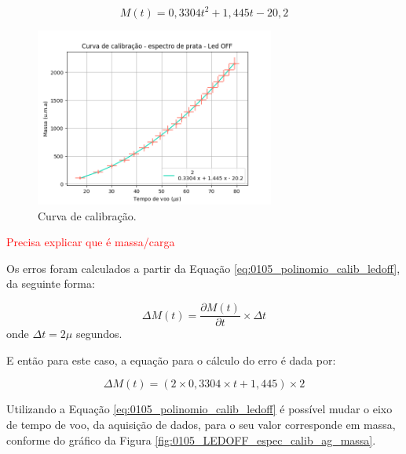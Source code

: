 \begin{equation}
\label{eq:0105_polinomio_calib_ledoff}
M(t) = 0,3304t^2 + 1,445t - 20,2
\end{equation}
\begin{figure}
  \centering  
  \includegraphics[width=0.7\textwidth]{exp_01/LEDOFF_curv+erro_calib.png}
  \caption{Curva de calibração.}
  \label{fig:1105_curva_calib_ledoff} 
\end{figure}



\textcolor{red}{Precisa explicar que é massa/carga}







Os erros foram calculados a partir da Equação \ref{eq:0105_polinomio_calib_ledoff}, da seguinte forma:

\begin{equation}
    \Delta M(t) = \frac{\partial M(t)}{\partial t} \times \Delta t
\end{equation}
onde $\Delta t = 2 \mu $ segundos.

E então para este caso, a equação para o cálculo do erro é dada por:

\begin{equation}
    \Delta M(t) = (2\times 0,3304 \times t + 1,445) \times 2
\end{equation}


Utilizando a Equação \ref{eq:0105_polinomio_calib_ledoff} é possível mudar o eixo de tempo de voo, da aquisição de dados, para o seu valor corresponde em massa, conforme do gráfico da Figura \ref{fig:0105_LEDOFF_espec_calib_ag_massa}.



